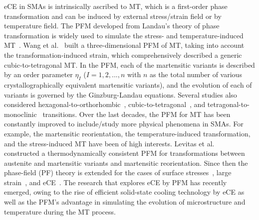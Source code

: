 \documentclass[reprint,3p,sort&compress,times,onecolumn]{elsarticle}
\begin{document}
eCE in SMAs is intrinsically ascribed to MT, which is a first-order phase transformation and can be induced by external stress/strain field or by temperature field. The PFM developed from Landau's theory of phase transformation is widely used to simulate the stress- and temperature-induced MT~\cite{chen2004phase}. Wang et al.~\cite{wang1997three} built a three-dimensional PFM of MT, taking into account the transformation-induced strain, which comprehensively described a generic cubic-to-tetragonal MT. In the PFM, each of the martensitic variants is described by an order parameter $\eta_I$ ($I = 1, 2, ... , n$ with $n$ as the total number of various crystallographically equivalent martensitic variants), and the evolution of each of variants is governed by the Ginzburg-Landau equations. Several studies also considered hexagonal-to-orthorhombic~\cite{wen2000phase}, cubic-to-tetragonal~\cite{seol2003cubic}, and tetragonal-to-monoclinic~\cite{mamivand2013phase} transitions.
Over the last decades, the PFM for MT has been constantly improved to include/study more physical phenomena in SMAs. For example, the martensitic reorientation, the temperature-induced transformation, and the stress-induced MT have been of high interests. 
Levitas et al.~\cite{levitas2002three,levitas2002three2,levitas2003three} constructed a thermodynamically consistent PFM for transformations between austenite and martensitic variants and martensitic reorientation. 
Since then the phase-field (PF) theory is extended for the cases of surface stresses~\cite{levitas2010surface,levitas2013thermodynamically}, large strain~\cite{levitas2009displacive,levitas2013phase}, and eCE~\cite{hou2019fatigue,cisse2020elastocaloric,cisse2020asymmetric,CISSE2021109898}. The research that explores eCE by PFM has recently emerged, owing to the rise of efficient solid-state cooling technology by eCE as well as the PFM's advantage in simulating the evolution of microstructure and temperature  during the MT process.
\end{document}
